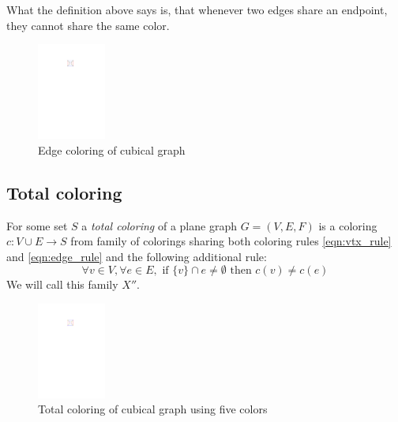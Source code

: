 What the definition above says is, that whenever two edges share an endpoint, they cannot share the same color. 

\begin{figure}[H]
    \centering
    \includegraphics[width=0.2\textwidth]{../Resources/Figs/cubical_edg_colr.pdf}
    \caption{Edge coloring of cubical graph}
    \label{fig:cubical_edge_coloring}
\end{figure}



\subsection{Total coloring}

\begin{definition}
    For some set $S$ a \textit{total coloring} of a plane graph $G=(V,E,F)$ is a coloring $c: V \cup E \rightarrow S$ from family of colorings sharing both coloring rules \ref{eqn:vtx_rule} and \ref{eqn:edge_rule} and the following additional rule: 
    \begin{equation}\label{eqn:tot_rule}
    \forall v \in V,  \forall e \in E, \text{ if } \{v\} \cap e \neq \emptyset \text{ then } c(v) \neq c(e) \tag{$R_T$}
    \end{equation}
    We will call this family $X''$.
\end{definition}

\begin{figure}[H]
    \centering
    \includegraphics[width=0.2\textwidth]{../Resources/Figs/cubical_tot_colr.pdf}
    \caption{Total coloring of cubical graph using five colors}
    \label{fig:cubical_tot_coloring}
\end{figure}

